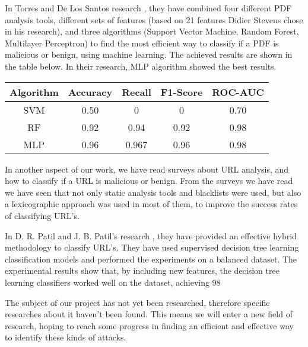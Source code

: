 \documentclass{article}
\begin{document}
\indent In Torres and De Los Santos research \cite{torres2018malicious}, they have combined four different PDF analysis tools, different sets of features (based on 21 features Didier Stevens chose in his research), and three algorithms (Support Vector Machine, Random Forest, Multilayer Perceptron) to find the most efficient way to classify if a PDF is malicious or benign, using machine learning. The achieved results are shown in the table below. In their research, MLP algorithm showed the best results.


\begin{table}[htb]
\centering
\begin{tabular}[c]{|c|c|c|c|c|}
\hline
Algorithm & Accuracy & Recall & F1-Score & ROC-AUC\\
\hline
SVM & 0.50 & 0 & 0 & 0.70\\
\hline
RF & 0.92 & 0.94 & 0.92 & 0.98\\
\hline
MLP & 0.96 & 0.967 & 0.96 & 0.98\\
\hline
\end{tabular}
\end{table}

\indent In another aspect of our work, we have read surveys about URL analysis, and how to classify if a URL is malicious or benign. From the surveys we have read we have seen that not only static analysis tools and blacklists were used, but also a lexicographic approach was used in most of them, to improve the success rates of classifying URL’s. 

\indent In D. R. Patil and J. B. Patil’s research \cite{patil2018malicious}, they have provided an effective hybrid methodology to classify URL’s. They have used supervised decision tree learning classification models and performed the experiments on a balanced dataset. The experimental results show that, by including new features, the decision tree learning classifiers worked well on the dataset, achieving 98%

\indent The subject of our project has not yet been researched, therefore specific researches about it haven’t been found. This means we will enter a new field of research, hoping to reach some progress in finding an efficient and effective way to identify these kinds of attacks. 
\end{document}
